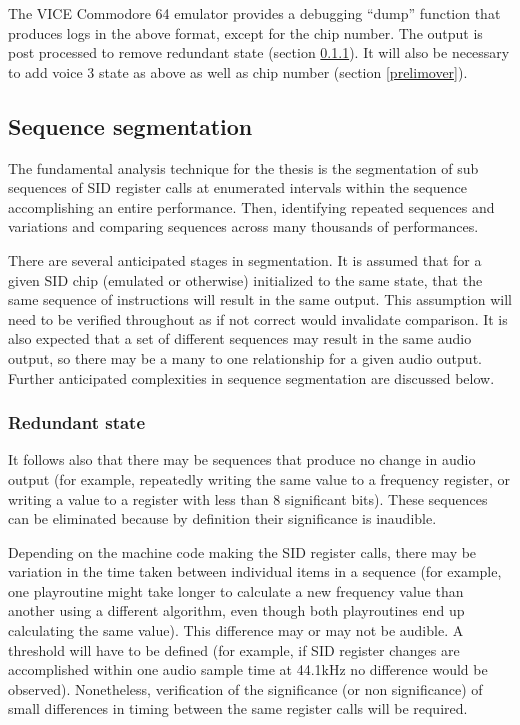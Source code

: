 \documentclass[10pt]{article}
\begin{document}
\begin{multicols*}{2}
The VICE Commodore 64 emulator\cite{asidvice} provides a debugging “dump” function that produces logs in the above format, except for the chip number. The output is post processed to remove redundant state (section \ref{redundantstate}). It will also be necessary to add voice 3 state as above as well as chip number (section \ref{prelimover}).

\subsection{Sequence segmentation}

The fundamental analysis technique for the thesis is the segmentation of sub sequences of SID register calls at enumerated intervals within the sequence accomplishing an entire performance. Then, identifying repeated sequences and variations and comparing sequences across many thousands of performances.

There are several anticipated stages in segmentation. It is assumed that for a given SID chip (emulated or otherwise) initialized to the same state, that the same sequence of instructions will result in the same output. This assumption will need to be verified throughout as if not correct would invalidate comparison. It is also expected that a set of different sequences may result in the same audio output, so there may be a many to one relationship for a given audio output. Further anticipated complexities in sequence segmentation are discussed below.

\subsubsection{Redundant state}
\label{redundantstate}

It follows also that there may be sequences that produce no change in audio output (for example, repeatedly writing the same value to a frequency register, or writing a value to a register with less than 8 significant bits). These sequences can be eliminated because by definition their significance is inaudible.

Depending on the machine code making the SID register calls, there may be variation in the time taken between individual items in a sequence (for example, one playroutine might take longer to calculate a new frequency value than another using a different algorithm, even though both playroutines end up calculating the same value). This difference may or may not be audible. A threshold will have to be defined (for example, if SID register changes are accomplished within one audio sample time at 44.1kHz no difference would be observed). Nonetheless, verification of the significance (or non significance) of small differences in timing between the same register calls will be required.


\end{multicols*}
\end{document}
